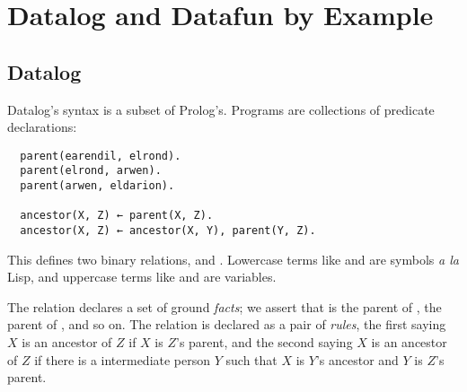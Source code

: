 \section{Datalog and Datafun by Example}
\label{sec:datalog-and-datafun}

\subsection{Datalog}

Datalog's syntax is a subset of Prolog's. Programs
are collections of predicate declarations:

\begin{verbatim}
  parent(earendil, elrond).
  parent(elrond, arwen).
  parent(arwen, eldarion).

  ancestor(X, Z) ← parent(X, Z).
  ancestor(X, Z) ← ancestor(X, Y), parent(Y, Z).
\end{verbatim}

This defines two binary relations,  and . Lowercase
terms like  and  are symbols \emph{a la} Lisp,
and uppercase terms like  and  are variables.

The  relation declares a set of ground \emph{facts}; we assert that
 is the parent of ,  the
parent of , and so on. The  relation is declared as
a pair of \emph{rules}, the first saying $X$ is an ancestor of $Z$ if $X$ is
$Z$'s parent, and the second saying $X$ is an ancestor of $Z$ if there is a
intermediate person $Y$ such that $X$ is $Y$'s ancestor and $Y$ is $Z$'s parent.

%

